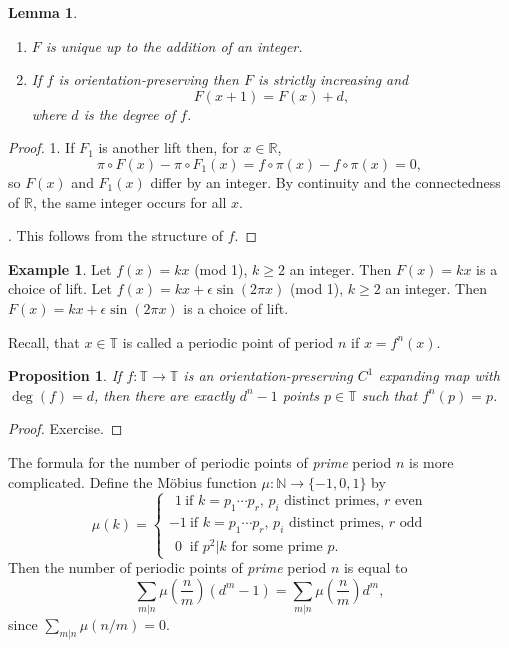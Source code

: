 \documentclass[12pt]{article}
\newtheorem{lemma}[theorem]{Lemma}
\newtheorem{proposition}[theorem]{Proposition}
\theoremstyle{definition}
\newtheorem{example}[theorem]{Example}
\theoremstyle{remark}
\begin{document}
\begin{lemma}
\begin{enumerate}
\item
$F$ is unique up to the addition of an integer.
\item
If $f$ is orientation-preserving then $F$ is strictly increasing and
\[
F(x+1) = F(x) +d,
\]
where $d$ is the degree of $f$. 
\end{enumerate}
\end{lemma}

\begin{proof}
1. If $F_1$ is another lift then, for $x \in \mathbb R$,
\[
\pi \circ F(x) - \pi \circ F_1(x) = f \circ \pi(x) - f\circ \pi(x) =0,
\]
so $F(x)$ and $F_1(x)$ differ by an integer. By continuity and the connectedness of $\mathbb R$, the same integer occurs for all $x$.

\medskip
{}. This follows from the structure of $f$.
\end{proof}

\begin{example}  Let $f(x) = kx$ (mod 1), $k \ge 2$ an integer. Then $F(x) = kx$ is a choice of lift.
Let $f(x) = kx   + \epsilon \sin(2\pi x)$ (mod 1), $k \ge 2$ an integer. Then 
$F(x) = kx + \epsilon \sin(2 \pi x)$ is a choice of lift.
\end{example}

Recall, that $x \in \mathbb T$ is called a periodic point of period $n$ if $x = f^n(x)$. 


\begin{proposition} If $f : \mathbb T \to \mathbb T$ is an orientation-preserving $C^1$ expanding
map with $\deg(f)=d$, then there
are exactly $d^n -1$ points $p \in \mathbb T$ such that $f^n(p) = p$.
\end{proposition}


\begin{proof} 
Exercise.
\end{proof}

The formula for the number of periodic points of {\it prime} period $n$ is more complicated.
Define the M\"obius function $\mu : \mathbb N \to \{-1,0,1\}$ by
\[
\mu(k) = 
\begin{cases} \ \ 1 \ \mbox{if $k=p_1 \cdots p_r$, $p_i$ distinct primes, $r$ even}
\\
-1 \ \mbox{if $k=p_1 \cdots p_r$, $p_i$ distinct primes, $r$ odd}
\\
\ \ 0 \ \mbox{ if $p^2|k$ for some prime $p$}.
\end{cases}
\]
Then the number of periodic points of {\it prime} period $n$ is equal to
\[
\sum_{m|n} \mu\left(\frac{n}{m}\right) (d^m-1) 
=
\sum_{m|n} \mu\left(\frac{n}{m}\right) d^m,
\]
since $\sum_{m|n} \mu(n/m) =0$.
\end{document}
